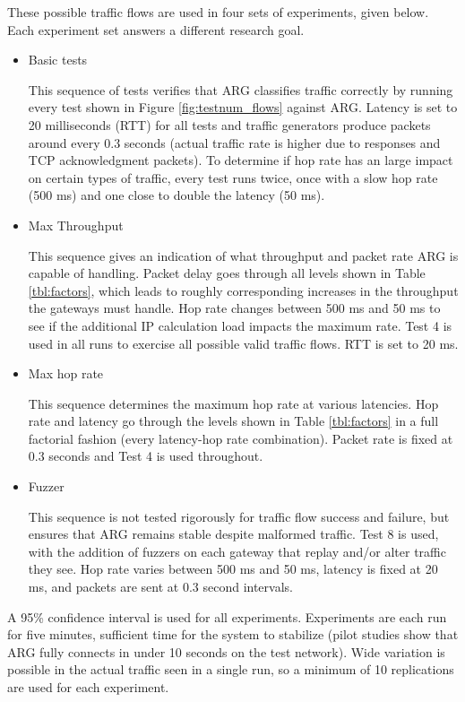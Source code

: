 \par These possible traffic flows are used in four sets of experiments, given below. Each experiment set answers a different research goal.
\begin{itemize}
	\item Basic tests
	\par This sequence of tests verifies that \ac{ARG} classifies traffic correctly by running every test shown in Figure \ref{fig:testnum_flows} against \ac{ARG}. Latency is set to 20 milliseconds (\ac{RTT}) for all tests and traffic generators produce packets around every 0.3 seconds (actual traffic rate is higher due to responses and \ac{TCP} acknowledgment packets). To determine if hop rate has an large impact on certain types of traffic, every test runs twice, once with a slow hop rate (500 ms) and one close to double the latency (50 ms).

	\item Max Throughput
	\par This sequence gives an indication of what throughput and packet rate \ac{ARG} is capable of handling. Packet delay goes through all levels shown in Table \ref{tbl:factors}, which leads to roughly corresponding increases in the throughput the gateways must handle. Hop rate changes between 500 ms and 50 ms to see if the additional \ac{IP} calculation load impacts the maximum rate. Test 4 is used in all runs to exercise all possible valid traffic flows. \ac{RTT} is set to 20 ms.

	\item Max hop rate
	\par This sequence determines the maximum hop rate at various latencies. Hop rate and latency go through the levels shown in Table \ref{tbl:factors} in a full factorial fashion (every latency-hop rate combination). Packet rate is fixed at 0.3 seconds and Test 4 is used throughout.

	\item Fuzzer
	\par This sequence is not tested rigorously for traffic flow success and failure, but ensures that \ac{ARG} remains stable despite malformed traffic. Test 8 is used, with the addition of fuzzers on each gateway that replay and/or alter traffic they see. Hop rate varies between 500 ms and 50 ms, latency is fixed at 20 ms, and packets are sent at 0.3 second intervals.
\end{itemize}

\par A 95\% confidence interval is used for all experiments. Experiments are each run for five minutes, sufficient time for the system to stabilize (pilot studies show that \ac{ARG} fully connects in under 10 seconds on the test network). Wide variation is possible in the actual traffic seen in a single run, so a minimum of 10 replications are used for each experiment.

